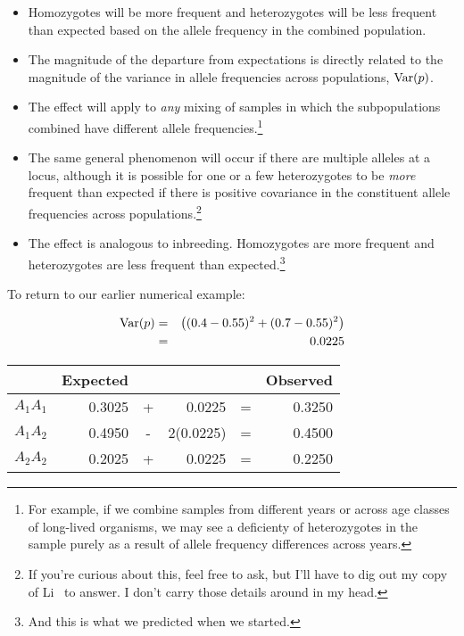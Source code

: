\begin{itemize}

\item Homozygotes will be more frequent and heterozygotes will be less
  frequent than expected based on the allele frequency in the combined
  population.

\item The magnitude of the departure from expectations is directly
  related to the magnitude of the variance in allele frequencies
  across populations, $\hbox{Var}(p)$.

\item The effect will apply to {\it any\/} mixing of samples in which
  the subpopulations combined have different allele
  frequencies.\footnote{For example, if we combine samples from
    different years or across age classes of long-lived organisms, we
    may see a deficienty of heterozygotes in the sample purely as a
    result of allele frequency differences across years.}

\item The same general phenomenon will occur if there are multiple
  alleles at a locus, although it is possible for one or a few
  heterozygotes to be {\it more\/} frequent than expected if there is
  positive covariance in the constituent allele frequencies across
  populations.\footnote{If you're curious about this, feel free to
    ask, but I'll have to dig out my copy of Li~\cite{Li-1976} to
    answer. I don't carry those details around in my head.}

\item The effect is analogous to inbreeding. Homozygotes are more
  frequent and heterozygotes are less frequent than
  expected.\footnote{And this is what we predicted when we started.}

\end{itemize}

To return to our earlier numerical example:

\begin{eqnarray}
\hbox{Var}(p) &=& \left((0.4 - 0.55)^2 + (0.7 - 0.55)^2\right) \\
              &=& 0.0225
\end{eqnarray}
\begin{center}
\begin{tabular}{l|rcrcr}
\hline\hline
         & Expected &   &           &   & Observed \\
\hline
$A_1A_1$ &   0.3025 & + &   0.0225  & = &   0.3250 \\
$A_1A_2$ &   0.4950 & - & 2(0.0225) & = &   0.4500 \\
$A_2A_2$ &   0.2025 & + &   0.0225  & = &   0.2250 \\
\hline
\end{tabular}
\end{center}

